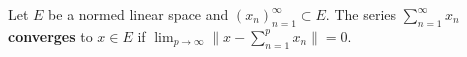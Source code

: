 Let $E$ be a normed linear space and $(x_n)_{n=1}^{\infty} \subset E$. The series $\sum_{n=1}^{\infty} x_n$ \textbf{converges} to $x \in E$ if $\lim_{p \to \infty} \| x - \sum_{n=1}^{p} x_n \| = 0$.
